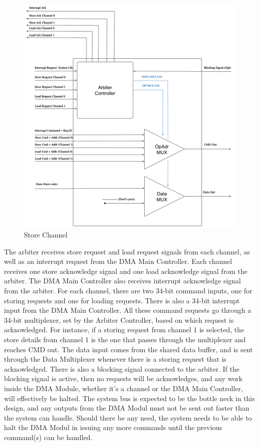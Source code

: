 \begin{appendix}
\begin{figure}[h!]
    \centering
    \includegraphics[width=1.0\textwidth]{Figures/DMA/Arbiter}
    \caption{Store Channel}
    \label{fig:arbiter}
\end{figure}

The arbiter receives store request and load request signals from each channel, as well as an interrupt request from the DMA Main Controller.
Each channel receives one store acknowledge signal and one load acknowledge signal from the arbiter.
The DMA Main Controller also receives interrupt acknowledge signal from the arbiter.
For each channel, there are two 34-bit command inputs, one for storing requests and one for loading requests.
There is also a 34-bit interrupt input from the DMA Main Controller.
All these command requests go through a 34-bit multiplexer, set by the Arbiter Controller, based on which request is acknowledged.
For instance, if a storing request from channel 1 is selected, the store details from channel 1 is the one that passes through the multiplexer and reaches CMD out.
The data input comes from the shared data buffer, and is sent through the Data Multiplexer whenever there is a storing request that is acknowledged.
There is also a blocking signal connected to the arbiter.
If the blocking signal is active, then no requests will be acknowledges, and any work inside the DMA Module, whether it's a channel or the DMA Main Controller, will effectively be halted.
The system bus is expected to be the bottle neck in this design, and any outputs from the DMA Modul must not be sent out faster than the system can handle.
Should there be any need, the system needs to be able to halt the DMA Modul in issuing any more commands until the previous command(s) can be handled. 


\end{appendix}
